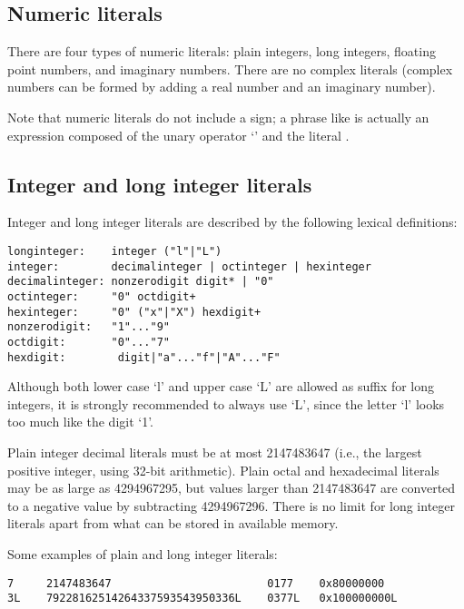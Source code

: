 \subsection{Numeric literals}

There are four types of numeric literals: plain integers, long
integers, floating point numbers, and imaginary numbers.  There are no
complex literals (complex numbers can be formed by adding a real
number and an imaginary number).

Note that numeric literals do not include a sign; a phrase like
 is actually an expression composed of the unary operator
`\code{-}' and the literal .

\subsection{Integer and long integer literals}

Integer and long integer literals are described by the following
lexical definitions:

\begin{verbatim}
longinteger:    integer ("l"|"L")
integer:        decimalinteger | octinteger | hexinteger
decimalinteger: nonzerodigit digit* | "0"
octinteger:     "0" octdigit+
hexinteger:     "0" ("x"|"X") hexdigit+
nonzerodigit:   "1"..."9"
octdigit:       "0"..."7"
hexdigit:        digit|"a"..."f"|"A"..."F"
\end{verbatim}

Although both lower case `l' and upper case `L' are allowed as suffix
for long integers, it is strongly recommended to always use `L', since
the letter `l' looks too much like the digit `1'.

Plain integer decimal literals must be at most 2147483647 (i.e., the
largest positive integer, using 32-bit arithmetic).  Plain octal and
hexadecimal literals may be as large as 4294967295, but values larger
than 2147483647 are converted to a negative value by subtracting
4294967296.  There is no limit for long integer literals apart from
what can be stored in available memory.

Some examples of plain and long integer literals:

\begin{verbatim}
7     2147483647                        0177    0x80000000
3L    79228162514264337593543950336L    0377L   0x100000000L
\end{verbatim}

